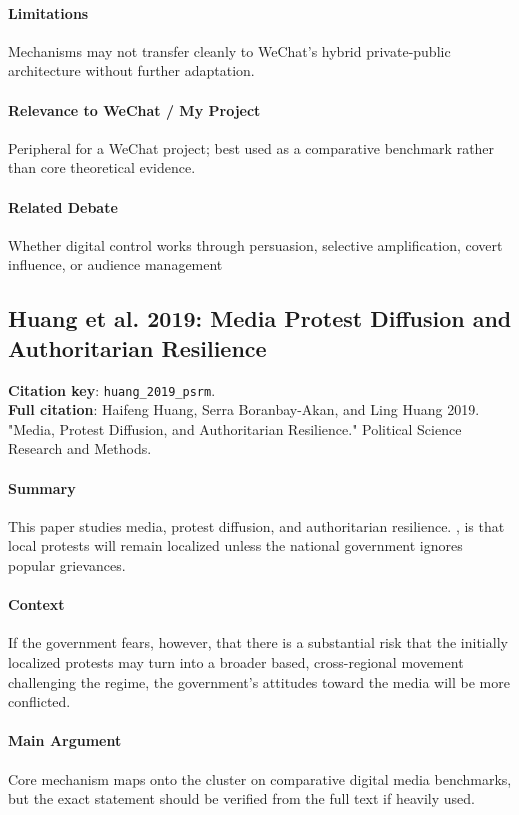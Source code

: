 \documentclass[12pt]{article}
\begin{document}
\paragraph{Limitations} Mechanisms may not transfer cleanly to WeChat's hybrid private-public architecture without further adaptation.

\paragraph{Relevance to WeChat / My Project} Peripheral for a WeChat project; best used as a comparative benchmark rather than core theoretical evidence.

\paragraph{Related Debate} Whether digital control works through persuasion, selective amplification, covert influence, or audience management


\subsection{Huang et al. 2019: Media Protest Diffusion and Authoritarian Resilience}
\textbf{Citation key}: \texttt{huang\_2019\_psrm}.\\
\textbf{Full citation}: Haifeng Huang, Serra Boranbay-Akan, and Ling Huang 2019. "Media, Protest Diffusion, and Authoritarian Resilience." Political Science Research and Methods.

\paragraph{Summary} This paper studies media, protest diffusion, and authoritarian resilience. , is that local protests will remain localized unless the national government ignores popular grievances.

\paragraph{Context} If the government fears, however, that there is a substantial risk that the initially localized protests may turn into a broader based, cross-regional movement challenging the regime, the government's attitudes toward the media will be more conflicted.

\paragraph{Main Argument} Core mechanism maps onto the cluster on comparative digital media benchmarks, but the exact statement should be verified from the full text if heavily used.
\end{document}
